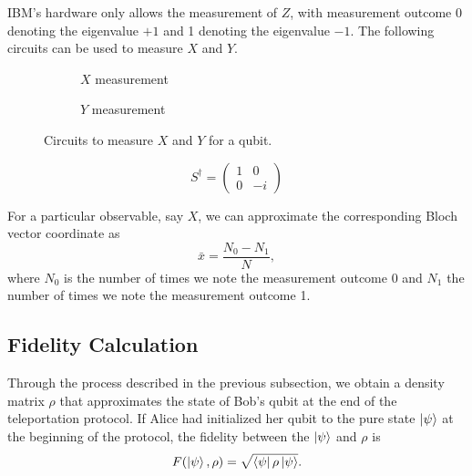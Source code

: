 \documentclass[prx,twocolumn]{revtex4-2}
\numberwithin{equation}{section}
\numberwithin{figure}{section}
\numberwithin{table}{section}
\begin{document}
IBM's hardware only allows the measurement of $Z$, with measurement outcome 0 denoting the eigenvalue $+1$ 
and 1 denoting the eigenvalue $-1$. The following circuits can be used to measure $X$ and $Y$.
\begin{figure}[h]
    \centering
    \begin{subfigure}[b]{0.4\columnwidth}
        \caption{$X$ measurement}
    \end{subfigure}
    \begin{subfigure}[b]{0.4\columnwidth}
        \caption{$Y$ measurement}
    \end{subfigure}
    \caption{Circuits to measure $X$ and $Y$ for a qubit.}
\end{figure}

\begin{equation}
    S^\dagger = \begin{pmatrix}
        1 & 0 \\ 
        0 & -i
    \end{pmatrix}
\end{equation}

For a particular observable, say $X$, we can approximate the corresponding Bloch vector coordinate as 
\begin{equation}
    \bar{x} = \frac{N_0 - N_1}{N},
\end{equation}
where $N_0$ is the number of times we note the measurement outcome 0 and $N_1$ the number of times we note 
the measurement outcome 1.

\subsection{Fidelity Calculation}
Through the process described in the previous subsection, we obtain a density matrix $\rho$ that approximates 
the state of Bob's qubit at the end of the teleportation protocol. If Alice had initialized her qubit to the 
pure state $\ket\psi$ at the beginning of the protocol, the fidelity between the $\ket\psi$ and $\rho$ is 
\cite{nielsen-chuang}
\begin{equation}
    F(\ket\psi, \rho) = \sqrt{\bra\psi \rho \ket\psi}.
\end{equation}
\end{document}
